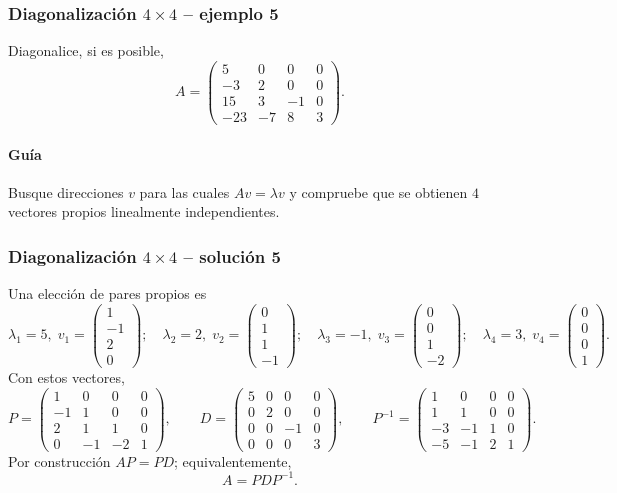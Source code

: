 \subsubsection*{Diagonalización $4\times 4$ -- ejemplo 5}

Diagonalice, si es posible,
\[
A=\begin{pmatrix}5 & 0 & 0 & 0\\-3 & 2 & 0 & 0\\15 & 3 & -1 & 0\\-23 & -7 & 8 & 3\end{pmatrix}.
\]

\paragraph{Guía}
Busque direcciones $v$ para las cuales $Av=\lambda v$ y compruebe que se obtienen $4$ vectores propios linealmente independientes.



\subsubsection*{Diagonalización $4\times 4$ -- solución 5}
\scriptsize
Una elección de pares propios es
\[
\lambda_1=5,\;v_1=\begin{pmatrix}1\\-1\\2\\0\end{pmatrix};\quad \lambda_2=2,\;v_2=\begin{pmatrix}0\\1\\1\\-1\end{pmatrix};\quad \lambda_3=-1,\;v_3=\begin{pmatrix}0\\0\\1\\-2\end{pmatrix};\quad \lambda_4=3,\;v_4=\begin{pmatrix}0\\0\\0\\1\end{pmatrix}.
\]
Con estos vectores,
\[
P=\begin{pmatrix}1 & 0 & 0 & 0\\-1 & 1 & 0 & 0\\2 & 1 & 1 & 0\\0 & -1 & -2 & 1\end{pmatrix},\qquad D=\begin{pmatrix}5 & 0 & 0 & 0\\0 & 2 & 0 & 0\\0 & 0 & -1 & 0\\0 & 0 & 0 & 3\end{pmatrix},\qquad P^{-1}=\begin{pmatrix}1 & 0 & 0 & 0\\1 & 1 & 0 & 0\\-3 & -1 & 1 & 0\\-5 & -1 & 2 & 1\end{pmatrix}.
\]
Por construcción $AP=PD$; equivalentemente,
\[
\boxed{A=PDP^{-1}}.
\]

